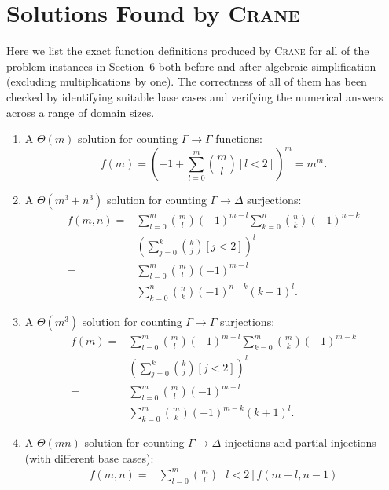 \documentclass{article}
\begin{document}
\section{Solutions Found by \textsc{Crane}}

Here we list the exact function definitions produced by \textsc{Crane} for all
of the problem instances in Section~6 both before and after algebraic
simplification (excluding multiplications by one). The correctness of all of
them has been checked by identifying suitable base cases and verifying the
numerical answers across a range of domain sizes.

\begin{enumerate}
  \item A $\Theta(m)$ solution for counting $\Gamma \to \Gamma$ functions:
        \[
        f(m) = {\left(-1 + \sum_{l=0}^{m} \binom{m}{l} [l < 2]\right)}^{m} = m^{m}.
        \]
  \item A $\Theta(m^3 + n^3)$ solution for counting $\Gamma \to \Delta$
        surjections:
        \begin{align*}
          f(m, n) ={}& \sum_{l=0}^{m} \binom{m}{l}{(-1)}^{m-l} \sum_{k=0}^{n} \binom{n}{k} {(-1)}^{n-k}\\
                     &{\left( \sum_{j=0}^{k} \binom{k}{j} [j < 2] \right)}^{l} \\
          ={}& \sum_{l=0}^{m} \binom{m}{l}{(-1)}^{m-l}\\
                     &\sum_{k=0}^{n} \binom{n}{k} {(-1)}^{n-k} {(k+1)}^{l}.
        \end{align*}
  \item A $\Theta(m^{3})$ solution for counting $\Gamma \to \Gamma$ surjections:
        \begin{align*}
          f(m) ={}& \sum_{l=0}^{m} \binom{m}{l}{(-1)}^{m-l} \sum_{k=0}^{m} \binom{m}{k} {(-1)}^{m-k}\\
                  &{\left( \sum_{j=0}^{k} \binom{k}{j} [j < 2] \right)}^{l} \\
          ={}& \sum_{l=0}^{m} \binom{m}{l}{(-1)}^{m-l}\\
                  &\sum_{k=0}^{m} \binom{m}{k} {(-1)}^{m-k} {(k+1)}^{l}.
        \end{align*}
  \item A $\Theta(mn)$ solution for counting $\Gamma \to \Delta$ injections and
        partial injections (with different base cases):
        \begin{align*}
          f(m, n) ={}& \sum_{l=0}^m \binom{m}{l} [l<2] f(m-l, n-1)\\

\end{align*}
\end{enumerate}
\end{document}
